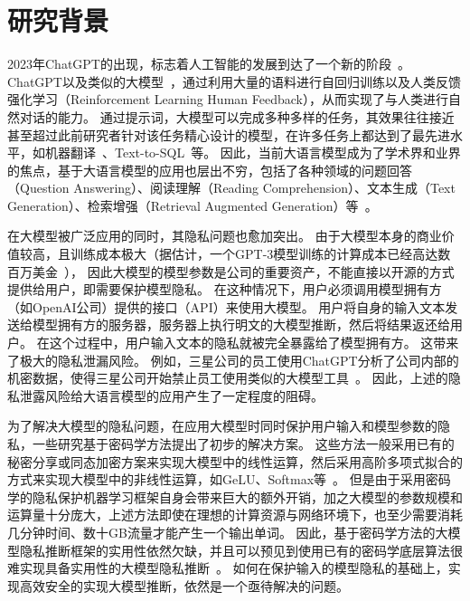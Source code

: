 \section{研究背景}
2023年ChatGPT的出现，标志着人工智能的发展到达了一个新的阶段~\cite{chatgpt}。
%
ChatGPT以及类似的大模型~\cite{touvron_2023_llama,zeng_2022_glm130b,jiang_2023_mistral,2023_gemini}，通过利用大量的语料进行自回归训练以及人类反馈强化学习（Reinforcement Learning Human Feedback），从而实现了与人类进行自然对话的能力。
%
通过提示词，大模型可以完成多种多样的任务，其效果往往接近甚至超过此前研究者针对该任务精心设计的模型，在许多任务上都达到了最先进水平，如机器翻译~\cite{jiaowenxiang_2023_llm_translation}、Text-to-SQL~\cite{gaodawei_2024_text2sql_llm}等。
%
因此，当前大语言模型成为了学术界和业界的焦点，基于大语言模型的应用也层出不穷，包括了各种领域的问题回答（Question Answering）、阅读理解（Reading Comprehension）、文本生成（Text Generation）、检索增强（Retrieval Augmented Generation）等~\cite{zhao_2023_llm_survey}。


在大模型被广泛应用的同时，其隐私问题也愈加突出。
%
由于大模型本身的商业价值较高，且训练成本极大（据估计，一个GPT-3模型训练的计算成本已经高达数百万美金~\cite{gpt3_technical_report}），
因此大模型的模型参数是公司的重要资产，不能直接以开源的方式提供给用户，即需要保护模型隐私。
%
在这种情况下，用户必须调用模型拥有方（如OpenAI公司）提供的接口（API）来使用大模型。
%
用户将自身的输入文本发送给模型拥有方的服务器，服务器上执行明文的大模型推断，然后将结果返还给用户。
%
在这个过程中，用户输入文本的隐私就被完全暴露给了模型拥有方。
%
这带来了极大的隐私泄漏风险。
%
例如，三星公司的员工使用ChatGPT分析了公司内部的机密数据，使得三星公司开始禁止员工使用类似的大模型工具~\cite{samsung_chatgpt_leak}。
%
因此，上述的隐私泄露风险给大语言模型的应用产生了一定程度的阻碍。


为了解决大模型的隐私问题，在应用大模型时同时保护用户输入和模型参数的隐私，一些研究基于密码学方法提出了初步的解决方案。
%
这些方法一般采用已有的秘密分享或同态加密方案来实现大模型中的线性运算，然后采用高阶多项式拟合的方式来实现大模型中的非线性运算，如GeLU、Softmax等~\cite{pang_2024_bolt_transformer,hou2023ciphergpt,dong2023puma,lu2023bumblebee}。
%
但是由于采用密码学的隐私保护机器学习框架自身会带来巨大的额外开销，加之大模型的参数规模和运算量十分庞大，上述方法即使在理想的计算资源与网络环境下，也至少需要消耗几分钟时间、数十GB流量才能产生一个输出单词。
%
因此，基于密码学方法的大模型隐私推断框架的实用性依然欠缺，并且可以预见到使用已有的密码学底层算法很难实现具备实用性的大模型隐私推断~\cite{hou2023ciphergpt}。
%
如何在保护输入的模型隐私的基础上，实现高效安全的实现大模型推断，依然是一个亟待解决的问题。
